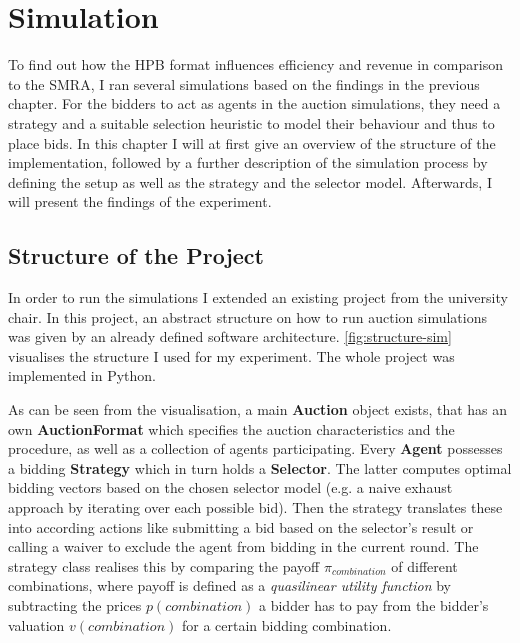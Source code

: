 \graphicspath{{./figures/ch4/}}

\chapter{Simulation}\label{chapter:simulation}

To find out how the HPB format influences efficiency and revenue in comparison to the SMRA, I ran several simulations based on the findings in the previous chapter. For the bidders to act as agents in the auction simulations, they need a strategy and a suitable selection heuristic to model their behaviour and thus to place bids. In this chapter I will at first give an overview of the structure of the implementation, followed by a further description of the simulation process by defining the setup as well as the strategy and the selector model. Afterwards, I will present the findings of the experiment.

\section{Structure of the Project}
In order to run the simulations I extended an existing project from the university chair. In this project, an abstract structure on how to run auction simulations was given by an already defined software architecture. \autoref{fig:structure-sim} visualises the structure I used for my experiment. The whole project was implemented in Python.

As can be seen from the visualisation, a main \textbf{Auction} object exists, that has an own \textbf{AuctionFormat} which specifies the auction characteristics and the procedure, as well as a collection of agents participating. Every \textbf{Agent} possesses a bidding \textbf{Strategy} which in turn holds a \textbf{Selector}. The latter computes optimal bidding vectors based on the chosen selector model (e.g. a naive exhaust approach by iterating over each possible bid). Then the strategy translates these into according actions like submitting a bid based on the selector's result or calling a waiver to exclude the agent from bidding in the current round. The strategy class realises this by comparing the payoff $ \pi_{combination} $ of different combinations, where payoff is defined as a \textit{quasilinear utility function} by subtracting the prices $ p(combination) $ a bidder has to pay from the bidder's valuation $ v(combination) $ for a certain bidding combination.

